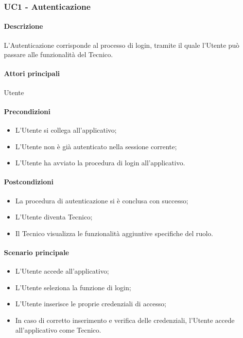 \subsubsection{UC1 - Autenticazione}\label{UC1}
\paragraph*{Descrizione}
L’Autenticazione corrisponde al processo di login, tramite il quale l'Utente può passare alle funzionalità del Tecnico.

\paragraph*{Attori principali}
Utente

\paragraph*{Precondizioni}
\begin{itemize}
  \item L’Utente si collega all’applicativo;
  \item L'Utente non è già autenticato nella sessione corrente;
  \item L’Utente ha avviato la procedura di login all’applicativo.
\end{itemize}

\paragraph*{Postcondizioni}
\begin{itemize}
  \item La procedura di autenticazione si è conclusa con successo;
  \item L’Utente diventa Tecnico;
  \item Il Tecnico visualizza le funzionalità aggiuntive specifiche del ruolo.  
\end{itemize}

\paragraph*{Scenario principale}
\begin{itemize}
  \item L’Utente accede all’applicativo;
  \item L’Utente seleziona la funzione di login;
  \item L’Utente inserisce le proprie credenziali di accesso;
  \item In caso di corretto inserimento e verifica delle credenziali, l’Utente accede all’applicativo come Tecnico.
\end{itemize}

